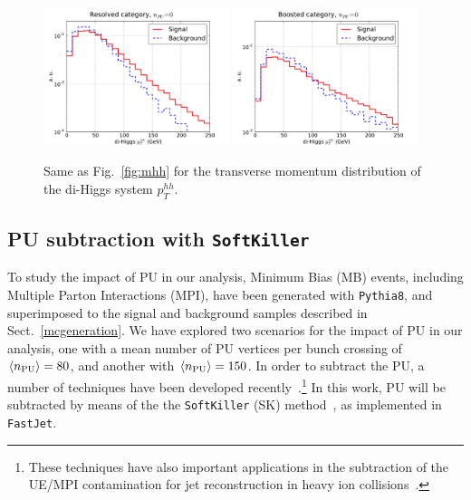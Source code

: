 \begin{figure}[t]
\begin{center}
  \includegraphics[width=0.48\textwidth]{plots/pt_HH_C2_res_noPU.pdf}
  \includegraphics[width=0.48\textwidth]{plots/pt_HH_C2_bst_noPU.pdf}
  \caption{\small Same as Fig.~\ref{fig:mhh} for the transverse momentum
    distribution of the di-Higgs system $p_T^{hh}$.
}
\label{fig:pthh}
\end{center}
\end{figure}


\subsection{PU subtraction with {\tt SoftKiller}}
\label{sec:pileup}

To study the impact of PU in our analysis,
Minimum Bias (MB) events,
including Multiple Parton Interactions (MPI), have been generated
with {\tt Pythia8}, and
superimposed to the signal
and background samples described in Sect.~\ref{mcgeneration}.
%
We have explored two scenarios for the impact
of PU in our analysis,
one with a mean number of
PU vertices per bunch crossing of $\left\langle n_{\rm PU}\right\rangle=80$, and another
with $\left\langle n_{\rm PU}\right\rangle=150$.
%
In order to subtract the PU, a number of techniques
have been developed
recently~\cite{Cacciari:2009dp,TheATLAScollaboration:2013pia,Butterworth:2008iy,Cacciari:2007fd,Krohn:2009th,Krohn:2013lba,Ellis:2009me,Bertolini:2014bba,Cacciari:2014gra,Cacciari:2014jta,Berta:2014eza,Larkoski:2014wba}.\footnote{
These techniques have also important applications in the subtraction
of the UE/MPI contamination for jet reconstruction
in heavy ion collisions~\cite{Cacciari:2010te}.
}
%
In this work, PU  will be subtracted by means
of the the {\tt SoftKiller} (SK)
method~\cite{Cacciari:2014gra}, as implemented in {\tt FastJet}.
%

